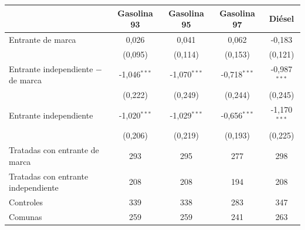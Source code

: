 \begin{tabular}{lcccc}
\toprule
 & Gasolina 93 & Gasolina 95 & Gasolina 97 & Diésel \\
\midrule
Entrante de marca & 0{,}026 & 0{,}041 & 0{,}062 & -0{,}183 \\
 & (0{,}095) & (0{,}114) & (0{,}153) & (0{,}121) \\
Entrante independiente $-$ de marca & -1{,}046$^{***}$ & -1{,}070$^{***}$ & -0{,}718$^{***}$ & -0{,}987$^{***}$ \\
 & (0{,}222) & (0{,}249) & (0{,}244) & (0{,}245) \\
Entrante independiente & -1{,}020$^{***}$ & -1{,}029$^{***}$ & -0{,}656$^{***}$ & -1{,}170$^{***}$ \\
 & (0{,}206) & (0{,}219) & (0{,}193) & (0{,}225) \\
\midrule
Tratadas con entrante de marca & 293 & 295 & 277 & 298 \\
Tratadas con entrante independiente & 208 & 208 & 194 & 208 \\
Controles & 339 & 338 & 283 & 347 \\
Comunas & 259 & 259 & 241 & 263 \\
\bottomrule
\end{tabular}
